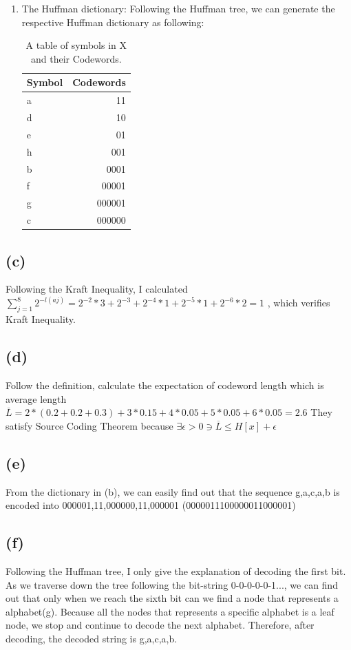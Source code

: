 \documentclass{article}
\begin{document}
\begin{CJK*}{UTF8}{bsmi}
\begin{enumerate}
\item The Huffman dictionary: Following the Huffman tree, we can generate the respective Huffman dictionary as following:
\begin{table}[h!]
\centering
\begin{tabular}{l|r}
Symbol & Codewords \\\hline
a & 11 \\
d & 10 \\
e & 01 \\
h & 001 \\
b & 0001 \\
f & 00001 \\
g & 000001 \\
c & 000000 
\end{tabular}
\caption{\label{tab:widgets}A table of symbols in X and their Codewords.}
\end{table}
\end{enumerate}

\subsection{(c)}
Following the Kraft Inequality, I calculated $\sum_{j=1}^{8}2^{-l(a{j})} = 2^{-2}*3 + 2^{-3} + 2^{-4} * 1 + 2^{-5}*1+2^{-6}*2 = 1$ , which verifies Kraft Inequality.

\subsection{(d)} Follow the definition, calculate the expectation of codeword length which is average length $\overline{L} = 2*(0.2+0.2+0.3)+3*0.15+4*0.05+5*0.05+6*0.05 = 2.6$
They satisfy Source Coding Theorem because $\exists \epsilon > 0 \ni \overline{L} \leq H[x] + \epsilon$

\subsection{(e)}
From the dictionary in (b), we can easily find out that the sequence {g,a,c,a,b} is encoded into {000001,11,000000,11,000001} (0000011100000011000001)

\subsection{(f)}
Following the Huffman tree, I only give the explanation of decoding the first bit. As we traverse down the tree following the bit-string 0-0-0-0-0-1..., we can find out that only when we reach the sixth bit can we find a node that represents a alphabet(g). Because all the nodes that represents a specific alphabet is a leaf node, we stop and continue to decode the next alphabet. Therefore, after decoding, the decoded string is {g,a,c,a,b}. 


\end{CJK*}
\end{document}
